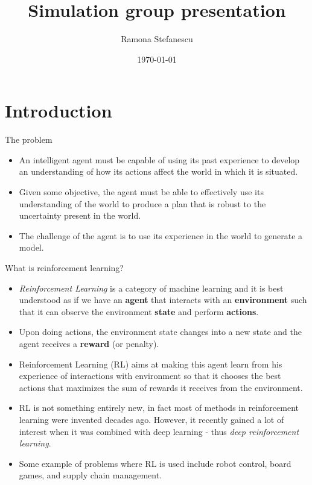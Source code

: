 \documentclass[10pt,mathserif]{beamer}
\title{\large \bfseries Simulation group presentation}
\author{Ramona Stefanescu\\[3ex]
}
\date{\today}
\begin{document}
\frame{
\thispagestyle{empty}
\titlepage
}

\section{Introduction}

\begin{frame}{The problem}
\begin{itemize}
\item An intelligent agent must be capable of using its past experience to develop an understanding of how
its actions affect the world in which it is situated.
\item Given some objective, the agent must be able to effectively use its understanding of the world to produce
a plan that is robust to the uncertainty present in the world.
\item The challenge of the agent is to use its experience in the world to generate a model.
\end{itemize}
\end{frame}

\begin{frame}{What is reinforcement learning?}
\begin{itemize}
\item \textit{Reinforcement Learning} is a category of machine learning and it is best understood as if we have an \textbf{agent} that interacts with an \textbf{environment} such that it can observe the environment \textbf{state} and perform \textbf{actions}.
\item Upon doing actions, the environment state changes into a new state and the agent receives a \textbf{reward} (or penalty).
\end{itemize}
\end{frame}

\begin{frame}
\begin{itemize}
\item Reinforcement Learning (RL) aims at making this agent learn from his experience of interactions with environment so that it chooses the best actions that maximizes the sum of rewards it receives from the environment.
\item RL is not something entirely new, in fact most of methods in reinforcement learning were invented decades ago. However, it recently gained a lot of interest when it was combined with deep learning - thus \textit{deep reinforcement learning}.
\item Some example of problems where RL is used include robot control, board games, and supply chain management.
\end{itemize}
\end{frame}
\end{document}
